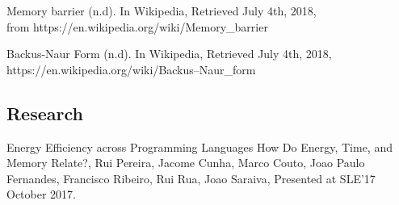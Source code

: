 Memory barrier (n.d). In Wikipedia, Retrieved July 4th, 2018, \\from https://en.wikipedia.org/wiki/Memory\_barrier

Backus-Naur Form (n.d). In Wikipedia, Retrieved July 4th, 2018, \\https://en.wikipedia.org/wiki/Backus–Naur\_form

\subsection{Research}

Energy Efficiency across Programming Languages How Do Energy, Time, and Memory Relate?, Rui Pereira, Jacome Cunha, Marco Couto, Joao Paulo Fernandes, Francisco Ribeiro, Rui Rua, Joao Saraiva, Presented at SLE'17 October 2017.
